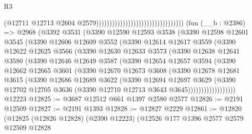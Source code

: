\begin{lexlean}{R3}
\begin{coremodule}
                                                                    (@12711
                                                                      @12713
                                                                      @2604
                                                                      @2579)))))))))))))))))))))))))))))))))
    (fun (__b : @2386) =>
    @2968
      (@3392
        @3531
        (@3390
          @12590
          @12593
          @3538
          (@3390
            @12598
            @12601
            @3545
            (@3390
              @12606
              @12609
              @3552
              (@3390
                @12614
                @12617
                @3559
                (@3390
                  @12622
                  @12625
                  @3566
                  (@3390
                    @12630
                    @12633
                    @3573
                    (@3390
                      @12638
                      @12641
                      @3580
                      (@3390
                        @12646
                        @12649
                        @3587
                        (@3390
                          @12654
                          @12657
                          @3594
                          (@3390
                            @12662
                            @12665
                            @3601
                            (@3390
                              @12670
                              @12673
                              @3608
                              (@3390
                                @12678
                                @12681
                                @3615
                                (@3390
                                  @12686
                                  @12689
                                  @3622
                                  (@3390
                                    @12694
                                    @12697
                                    @3629
                                    (@3390
                                      @12702
                                      @12705
                                      @3636
                                      (@3390 @12710 @12713 @3643 @3645))))))))))))))))))
    @12223
@12825 := @3687 @12512 @661 @1397 @2580 @2577
@12826 := @2191 @12509
@12827 := @2191 @1393
@12828 := @12827 @2229
@12861 := @12820
    (@12825
      (@12826 @12828)
      (@2390 @12223)
      (@12526
        @177
        @1396
        @2577
        @2579
        @12509
        @12828

\end{coremodule}
\end{lexlean}
